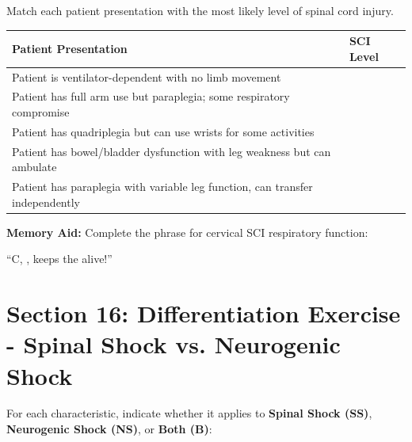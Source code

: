 \documentclass[11pt]{article}
\begin{document}
\begin{tcolorbox}[colback=purple!5!white,colframe=purple!75!black,title=Instructions]
Match each patient presentation with the most likely level of spinal cord injury.
\end{tcolorbox}

\begin{tabular}{|p{8cm}|p{5cm}|}
\hline
\textbf{Patient Presentation} & \textbf{SCI Level} \\
\hline
Patient is ventilator-dependent with no limb movement & \underline{\hspace{4cm}} \\
\hline
Patient has full arm use but paraplegia; some respiratory compromise & \underline{\hspace{4cm}} \\
\hline
Patient has quadriplegia but can use wrists for some activities & \underline{\hspace{4cm}} \\
\hline
Patient has bowel/bladder dysfunction with leg weakness but can ambulate & \underline{\hspace{4cm}} \\
\hline
Patient has paraplegia with variable leg function, can transfer independently & \underline{\hspace{4cm}} \\
\hline
\end{tabular}

\vspace{0.5cm}

\textbf{Memory Aid:} Complete the phrase for cervical SCI respiratory function:

``C\underline{\hspace{0.5cm}}, \underline{\hspace{0.5cm}}, \underline{\hspace{0.5cm}} keeps the \underline{\hspace{3cm}} alive!''

\vspace{1cm}

\section*{Section 16: Differentiation Exercise - Spinal Shock vs. Neurogenic Shock}

For each characteristic, indicate whether it applies to \textbf{Spinal Shock (SS)}, \textbf{Neurogenic Shock (NS)}, or \textbf{Both (B)}:
\end{document}
